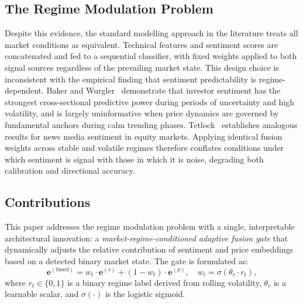 \documentclass[journal]{IEEEtran}
\begin{document}
\subsection{The Regime Modulation Problem}
Despite this evidence, the standard modelling approach in the literature treats
all market conditions as equivalent. Technical features and sentiment scores are
concatenated and fed to a sequential classifier, with fixed weights applied to
both signal sources regardless of the prevailing market state. This design choice
is inconsistent with the empirical finding that sentiment predictability is
regime-dependent. Baker and Wurgler~\cite{baker2007investor} demonstrate that
investor sentiment has the strongest cross-sectional predictive power during
periods of uncertainty and high volatility, and is largely uninformative when
price dynamics are governed by fundamental anchors during calm trending phases.
Tetlock~\cite{tetlock2007giving} establishes analogous results for news media
sentiment in equity markets. Applying identical fusion weights across stable and
volatile regimes therefore conflates conditions under which sentiment is signal
with those in which it is noise, degrading both calibration and directional
accuracy.

\subsection{Contributions}
This paper addresses the regime modulation problem with a single, interpretable
architectural innovation: a \textit{market-regime-conditioned adaptive fusion
gate} that dynamically adjusts the relative contribution of sentiment and price
embeddings based on a detected binary market state. The gate is formulated as:
\begin{equation}
  \mathbf{e}^{(\text{fused})} = w_t \cdot \mathbf{e}^{(s)}
    + (1-w_t) \cdot \mathbf{e}^{(p)},
  \quad w_t = \sigma(\theta_r \cdot r_t),
  \label{eq:intro_gate}
\end{equation}
where $r_t \in \{0,1\}$ is a binary regime label derived from rolling volatility,
$\theta_r$ is a learnable scalar, and $\sigma(\cdot)$ is the logistic sigmoid.
\end{document}
